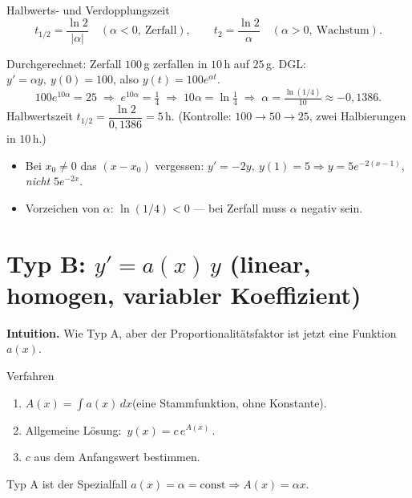\documentclass[a4paper,11pt]{article}
\begin{document}
\begin{satzbox}{Halbwerts- und Verdopplungszeit}
\[
  t_{1/2}=\frac{\ln 2}{|\alpha|}\quad(\alpha<0,\ \text{Zerfall}),
  \qquad
  t_{2}=\frac{\ln 2}{\alpha}\quad(\alpha>0,\ \text{Wachstum}).
\]
\end{satzbox}

\begin{bspbox}{Durchgerechnet: Zerfall}
$100\,$g zerfallen in $10\,$h auf $25\,$g. DGL: $y'=\alpha y,\ y(0)=100$, also $y(t)=100e^{\alpha t}$.
\[
  100e^{10\alpha}=25 \;\Rightarrow\; e^{10\alpha}=\tfrac14
  \;\Rightarrow\; 10\alpha=\ln\tfrac14 \;\Rightarrow\; \alpha=\tfrac{\ln(1/4)}{10}\approx-0{,}1386.
\]
Halbwertszeit $t_{1/2}=\dfrac{\ln 2}{0{,}1386}=5\,$h. (Kontrolle: $100\to50\to25$, zwei
Halbierungen in $10\,$h.)
\end{bspbox}

\begin{fehlerbox}
\begin{itemize}[leftmargin=1.4em,itemsep=2pt]
  \item Bei $x_0\neq0$ das $(x-x_0)$ vergessen: $y'=-2y,\ y(1)=5 \Rightarrow y=5e^{-2(x-1)}$,
        \emph{nicht} $5e^{-2x}$.
  \item Vorzeichen von $\alpha$: $\ln(1/4)<0$ — bei Zerfall muss $\alpha$ negativ sein.
\end{itemize}
\end{fehlerbox}

\section{Typ B: $y'=a(x)\,y$ (linear, homogen, variabler Koeffizient)}

\textbf{Intuition.} Wie Typ A, aber der Proportionalitätsfaktor ist jetzt eine Funktion $a(x)$.

\begin{satzbox}{Verfahren}
\begin{enumerate}[leftmargin=1.6em,itemsep=2pt]
  \item $A(x)=\displaystyle\int a(x)\,dx$\quad (eine Stammfunktion, ohne Konstante).
  \item Allgemeine Lösung: $\boxed{\,y(x)=c\,e^{A(x)}\,}$.
  \item $c$ aus dem Anfangswert bestimmen.
\end{enumerate}
Typ A ist der Spezialfall $a(x)=\alpha=\text{const}\Rightarrow A(x)=\alpha x$.
\end{satzbox}
\end{document}
